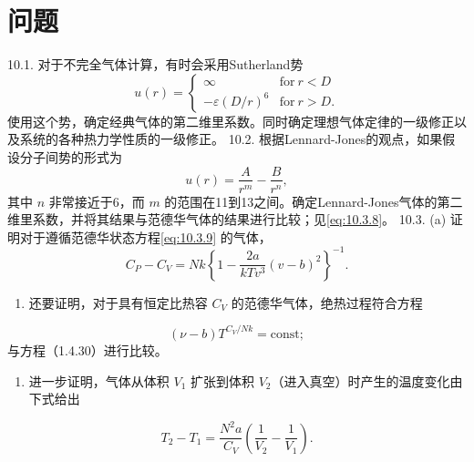 \section{问题}\label{ux95eeux9898_chap10}
10.1. 对于不完全气体计算，有时会采用Sutherland势
\begin{equation}\tag{10.7.27}\label{eq:10.7.27}
u ( r ) = \left\{ \begin{array}{ll} { \infty } & { \mathrm { f o r } \ r < D } \\{ - \varepsilon ( D / r ) ^{6} } & { \mathrm { f o r } \ r > D . } \end{array} \right.
\end{equation}
使用这个势，确定经典气体的第二维里系数。同时确定理想气体定律的一级修正以及系统的各种热力学性质的一级修正。
10.2. 根据Lennard-Jones的观点，如果假设分子间势的形式为
\begin{equation}\tag{10.7.28}\label{eq:10.7.28}
u ( r ) = \frac { A } { r ^{m} } - \frac { B } { r ^{n} } ,
\end{equation}
其中 \(n\) 非常接近于6，而 \(m\) 的范围在11到13之间。确定Lennard-Jones气体的第二维里系数，并将其结果与范德华气体的结果进行比较；见\autoref{eq:10.3.8}。
10.3. (a) 证明对于遵循范德华状态方程\autoref{eq:10.3.9} 的气体，
\begin{equation}\tag{10.7.29}\label{eq:10.7.29}
C _ { P } - C _ { V } = N k \left\{ 1 - \frac { 2 a } { k T v ^{3} } ( v - b ) ^{2} \right\} ^{- 1} .
\end{equation}
\begin{enumerate}
\def\labelenumi{(\alph{enumi})}
\setcounter{enumi}{1}
\item
  还要证明，对于具有恒定比热容 \(C_V\) 的范德华气体，绝热过程符合方程
\end{enumerate}
\begin{equation}\tag{10.7.30}\label{eq:10.7.30}
( \nu - b ) T ^{C _ { V} / N k } = \mathrm { c o n s t } ;
\end{equation}
与方程（1.4.30）进行比较。
\begin{enumerate}
\def\labelenumi{(\alph{enumi})}
\setcounter{enumi}{2}
\item
  进一步证明，气体从体积 \(V_{1}\) 扩张到体积 \(V_{2}\)（进入真空）时产生的温度变化由下式给出
\end{enumerate}
\begin{equation}\tag{10.7.31}\label{eq:10.7.31}
T _ { 2 } - T _ { 1 } = \frac { N ^{2} a } { C _ { V } } \left( \frac { 1 } { V _ { 2 } } - \frac { 1 } { V _ { 1 } } \right) .
\end{equation}
